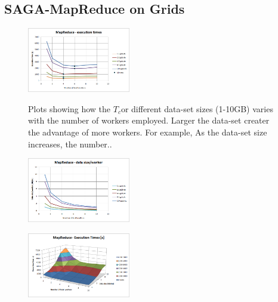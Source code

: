 \documentclass[conference,final]{IEEEtran}
\newcommand{\tc}[1]{$T_c$}
\begin{document}
\subsection{SAGA-MapReduce on Grids}

\begin{figure}[t]
  \includegraphics[width=0.4\textwidth]{MapReduce_local_executiontime.png}
\label{3}
\caption{Plots showing how the \tc for different data-set sizes
  (1-10GB) varies with the number of workers employed.
  Larger the data-set creater the advantage of more workers. For
  example, As the data-set size increases, the number..}

\end{figure}

\begin{figure}[t]
  \includegraphics[width=0.4\textwidth]{MapReduce_local_datasizeperworker.png}
\label{1}
\end{figure}

\begin{figure}[t]
  \includegraphics[width=0.4\textwidth]{MapReduce_local_executiontime_3d.png}
\label{2}
\end{figure}



\end{document}
